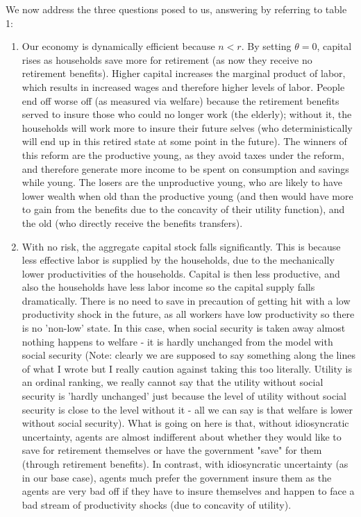 \documentclass[11pt]{article} %
\begin{document}
We now address the three questions posed to us, answering by referring to table 1:
\begin{enumerate}
\item Our economy is dynamically efficient because $n<r$. By setting $\theta = 0$, capital rises as households save more for retirement (as now they receive no retirement benefits). Higher capital increases the marginal product of labor, which results in increased wages and therefore higher levels of labor. People end off worse off (as measured via welfare) because the retirement benefits served to insure those who could no longer work (the elderly); without it, the households will work more to insure their future selves (who deterministically will end up in this retired state at some point in the future). The winners of this reform are the productive young, as they avoid taxes under the reform, and therefore generate more income to be spent on consumption and savings while young. The losers are the unproductive young, who are likely to have lower wealth when old than the productive young (and then would have more to gain from the benefits due to the concavity of their utility function), and the old (who directly receive the benefits transfers).
\item With no risk, the aggregate capital stock falls significantly. This is because less effective labor is supplied by the households, due to the mechanically lower productivities of the households. Capital is then less productive, and also the households have less labor income so the capital supply falls dramatically. There is no need to save in precaution of getting hit with a low productivity shock in the future, as all workers have low productivity so there is no 'non-low' state. In this case, when social security is taken away almost nothing happens to welfare - it is hardly unchanged from the model with social security (Note: clearly we are supposed to say something along the lines of what I wrote but I really caution against taking this too literally. Utility is an ordinal ranking, we really cannot say that the utility without social security is 'hardly unchanged' just because the level of utility without social security is close to the level without it - all we can say is that welfare is lower without social security). What is going on here is that, without idiosyncratic uncertainty, agents are almost indifferent about whether they would like to save for retirement themselves or have the government "save" for them (through retirement benefits). In contrast, with idiosyncratic uncertainty (as in our base case), agents much prefer the government insure them as the agents are very bad off if they have to insure themselves and happen to face a bad stream of productivity shocks (due to concavity of utility). 

\end{enumerate}
\end{document}
